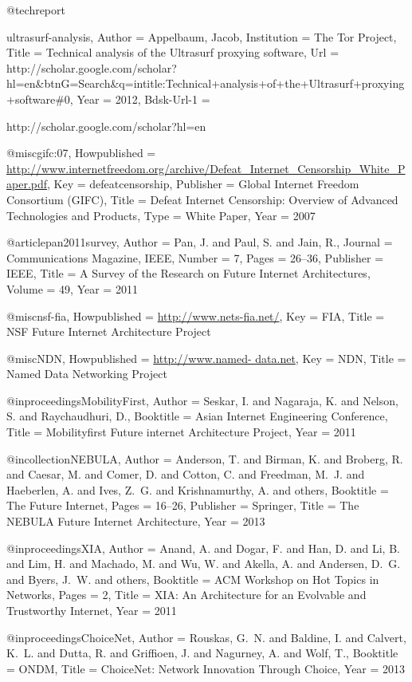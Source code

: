 @techreport{ultrasurf-analysis,
	Author = {Appelbaum, Jacob},
	Institution = {The Tor Project},
	Title = {{Technical analysis of the Ultrasurf proxying software}},
	Url = {http://scholar.google.com/scholar?hl=en\&btnG=Search\&q=intitle:Technical+analysis+of+the+Ultrasurf+proxying+software\#0},
	Year = {2012},
	Bdsk-Url-1 = {http://scholar.google.com/scholar?hl=en%

@misc{gifc:07,
	Howpublished = {\url{http://www.internetfreedom.org/archive/Defeat\_Internet\_Censorship\_White\_Paper.pdf}},
	Key = {defeatcensorship},
	Publisher = {Global Internet Freedom Consortium (GIFC)},
	Title = {{Defeat Internet Censorship: Overview of Advanced Technologies and Products}},
	Type = {White Paper},
	Year = {2007}}

@article{pan2011survey,
	Author = {Pan, J. and Paul, S. and Jain, R.},
	Journal = {Communications Magazine, IEEE},
	Number = {7},
	Pages = {26--36},
	Publisher = {IEEE},
	Title = {{A Survey of the Research on Future Internet Architectures}},
	Volume = {49},
	Year = {2011}}

@misc{nsf-fia,
	Howpublished = {\url{http://www.nets-fia.net/}},
	Key = {FIA},
	Title = {{NSF Future Internet Architecture Project}}}

@misc{NDN,
	Howpublished = {\url{http://www.named- data.net}},
	Key = {NDN},
	Title = {{Named Data Networking Project}}}

@inproceedings{MobilityFirst,
	Author = {Seskar, I. and Nagaraja, K. and Nelson, S. and Raychaudhuri, D.},
	Booktitle = {Asian Internet Engineering Conference},
	Title = {{Mobilityfirst Future internet Architecture Project}},
	Year = {2011}}

@incollection{NEBULA,
	Author = {Anderson, T. and Birman, K. and Broberg, R. and Caesar, M. and Comer, D. and Cotton, C. and Freedman, M.~J. and Haeberlen, A. and Ives, Z.~G. and Krishnamurthy, A. and others},
	Booktitle = {The Future Internet},
	Pages = {16--26},
	Publisher = {Springer},
	Title = {{The NEBULA Future Internet Architecture}},
	Year = {2013}}

@inproceedings{XIA,
	Author = {Anand, A. and Dogar, F. and Han, D. and Li, B. and Lim, H. and Machado, M. and Wu, W. and Akella, A. and Andersen, D.~G. and Byers, J.~W. and others},
	Booktitle = {ACM Workshop on Hot Topics in Networks},
	Pages = {2},
	Title = {{XIA: An Architecture for an Evolvable and Trustworthy Internet}},
	Year = {2011}}

@inproceedings{ChoiceNet,
	Author = {Rouskas, G.~N. and Baldine, I. and Calvert, K.~L. and Dutta, R. and Griffioen, J. and Nagurney, A. and Wolf, T.},
	Booktitle = {ONDM},
	Title = {{ChoiceNet: Network Innovation Through Choice}},
	Year = {2013}}

}}

